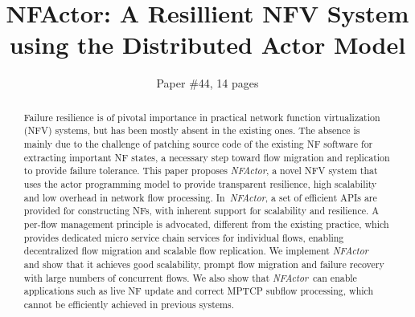 \documentclass{sig-alternate-10pt}
\def\nfactor{\textit{NFActor}}
\begin{document}
\title{\Large \bf NFActor: A Resillient NFV System using the Distributed Actor Model}


\author{
Paper \#44, 14 pages
}


\maketitle



\begin{abstract}

Failure resilience is of pivotal importance in practical network function virtualization (NFV) systems, but has been mostly absent in the existing ones.
The absence is mainly due to the challenge of patching source code of the existing NF software for extracting important NF states, a necessary step toward flow migration and replication to provide failure tolerance. %
 This paper proposes \nfactor, a novel NFV system that uses the actor programming model to provide transparent resilience, high scalability and low overhead in network flow processing. %
 In~\nfactor, a set of efficient APIs are provided for constructing NFs, with inherent support for scalability and resilience. A per-flow management principle is advocated, different from the existing practice, which provides dedicated micro service chain services for individual flows, enabling decentralized flow migration and scalable flow replication. %
We implement \nfactor~%
 and show that it achieves good scalability, prompt flow migration and failure recovery with large numbers of concurrent flows. 
We also show that \nfactor~can enable applications such as live NF update and correct MPTCP subflow processing, which cannot be efficiently achieved in previous systems. %


\end{abstract}
\end{document}
